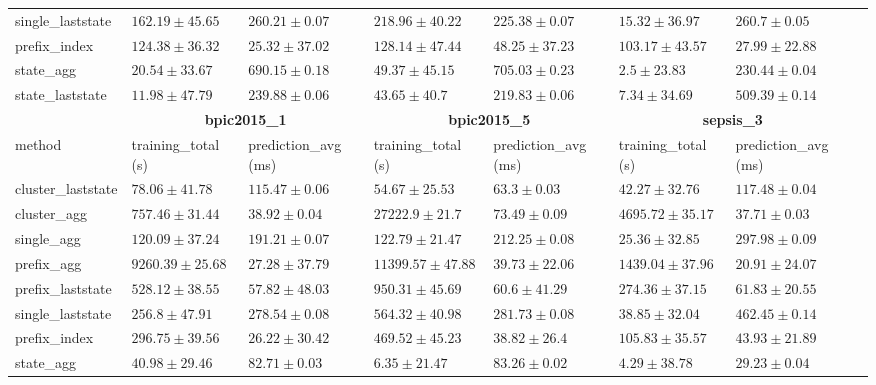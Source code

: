 \documentclass[twoside,11pt]{Latex/Classes/PhDthesisPSnPDF}
\begin{document}
\begin{table}[h]
{\begin{tabular}{llllllll}
			single\_laststate & $162.19 \pm 45.65$ & $260.21 \pm 0.07$ & $218.96 \pm 40.22$ & $225.38 \pm 0.07$ & $15.32 \pm 36.97$ & $260.7 \pm 0.05$ \\ 
			prefix\_index & $124.38 \pm 36.32$ & $\mathbf{25.32 \pm 37.02}$ & $128.14 \pm 47.44$ & $48.25 \pm 37.23$ & $103.17 \pm 43.57$ & $\mathbf{27.99 \pm 22.88}$ \\ 
			state\_agg & $20.54 \pm 33.67$ & $690.15 \pm 0.18$ & $49.37 \pm 45.15$ & $705.03 \pm 0.23$ & $\mathbf{2.5 \pm 23.83}$ & $230.44 \pm 0.04$ \\ 
			state\_laststate & $\mathbf{11.98 \pm 47.79}$ & $239.88 \pm 0.06$ & $\mathbf{43.65 \pm 40.7}$ & $219.83 \pm 0.06$ & $7.34 \pm 34.69$ & $509.39 \pm 0.14$ \\ 
			\bottomrule
			\toprule
			& \multicolumn{2}{c}{{\bfseries bpic2015\_1}} & \multicolumn{2}{c}{{\bfseries bpic2015\_5}} & \multicolumn{2}{c}{{\bfseries sepsis\_3}} \\ \cmidrule(lr){2-3} \cmidrule(lr){4-5} \cmidrule(lr){6-7}
			method  & training\_total (s) & prediction\_avg (ms) & training\_total (s) & prediction\_avg (ms) & training\_total (s) & prediction\_avg (ms) \\ \midrule
			cluster\_laststate & $78.06 \pm 41.78$ & $115.47 \pm 0.06$ & $54.67 \pm 25.53$ & $63.3 \pm 0.03$ & $42.27 \pm 32.76$ & $117.48 \pm 0.04$ \\ 
			cluster\_agg & $757.46 \pm 31.44$ & $38.92 \pm 0.04$ & $27222.9 \pm 21.7$ & $73.49 \pm 0.09$ & $4695.72 \pm 35.17$ & $37.71 \pm 0.03$ \\ 
			single\_agg & $120.09 \pm 37.24$ & $191.21 \pm 0.07$ & $122.79 \pm 21.47$ & $212.25 \pm 0.08$ & $25.36 \pm 32.85$ & $297.98 \pm 0.09$ \\ 
			prefix\_agg & $9260.39 \pm 25.68$ & $27.28 \pm 37.79$ & $11399.57 \pm 47.88$ & $39.73 \pm 22.06$ & $1439.04 \pm 37.96$ & $\mathbf{20.91 \pm 24.07}$ \\ 
			prefix\_laststate & $528.12 \pm 38.55$ & $57.82 \pm 48.03$ & $950.31 \pm 45.69$ & $60.6 \pm 41.29$ & $274.36 \pm 37.15$ & $61.83 \pm 20.55$ \\ 
			single\_laststate & $256.8 \pm 47.91$ & $278.54 \pm 0.08$ & $564.32 \pm 40.98$ & $281.73 \pm 0.08$ & $38.85 \pm 32.04$ & $462.45 \pm 0.14$ \\ 
			prefix\_index & $296.75 \pm 39.56$ & $\mathbf{26.22 \pm 30.42}$ & $469.52 \pm 45.23$ & $\mathbf{38.82 \pm 26.4}$ & $105.83 \pm 35.57$ & $43.93 \pm 21.89$ \\ 
			state\_agg & $\mathbf{40.98 \pm 29.46}$ & $82.71 \pm 0.03$ & $\mathbf{6.35 \pm 21.47}$ & $83.26 \pm 0.02$ & $\mathbf{4.29 \pm 38.78}$ & $29.23 \pm 0.04$ \\ 

\end{tabular}}
\end{table}
\end{document}
